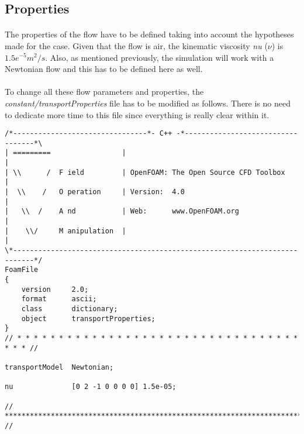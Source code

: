 \subsection{Properties}
\paragraph{}The properties of the flow have to be defined taking into account the hypotheses made for the case. Given that the flow is air, the kinematic viscosity \textit{nu} ($\nu$) is $1.5e^{-5} m^2/s$. Also, as mentioned previously, the simulation will work with a Newtonian flow and this has to be defined here as well.

\paragraph{}To change all these flow parameters and properties, the \textit{constant/transportProperties} file has to be modified as follows. There is no need to dedicate more time to this file since everything is really clear within it.

\begin{footnotesize}
\begin{verbatim}
/*--------------------------------*- C++ -*----------------------------------*\
| =========                 |                                                 |
| \\      /  F ield         | OpenFOAM: The Open Source CFD Toolbox           |
|  \\    /   O peration     | Version:  4.0                                   |
|   \\  /    A nd           | Web:      www.OpenFOAM.org                      |
|    \\/     M anipulation  |                                                 |
\*---------------------------------------------------------------------------*/
FoamFile
{
    version     2.0;
    format      ascii;
    class       dictionary;
    object      transportProperties;
}
// * * * * * * * * * * * * * * * * * * * * * * * * * * * * * * * * * * * * * //

transportModel  Newtonian;

nu              [0 2 -1 0 0 0 0] 1.5e-05;

// ************************************************************************* //
\end{verbatim}
\end{footnotesize}

